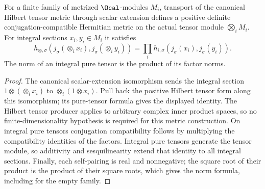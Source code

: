 \begin{lemma}
\label{lem:arithmetic-tensor-metric}
\leanok
For a finite family of metrized $\Ocal$-modules $M_i$, transport of the
canonical Hilbert tensor metric through scalar extension defines a positive
definite conjugation-compatible Hermitian metric on the actual tensor module
$\bigotimes_i M_i$. For integral sections $x_i,y_i\in M_i$ it satisfies
\[
 h_{\otimes,\sigma}(j_\sigma(\otimes_i x_i),j_\sigma(\otimes_i y_i))
   =\prod_i h_{i,\sigma}(j_\sigma(x_i),j_\sigma(y_i)).
\]
The norm of an integral pure tensor is the product of its factor norms.
\end{lemma}
\begin{proof}
The canonical scalar-extension isomorphism sends the integral section
$1\otimes(\otimes_i x_i)$ to $\otimes_i(1\otimes x_i)$.
Pull back the positive Hilbert tensor form along this isomorphism;
its pure-tensor formula gives the displayed identity. The Hilbert tensor
producer applies to arbitrary complex inner product spaces, so no
finite-dimensionality hypothesis is required for this metric construction.
On integral pure tensors conjugation compatibility follows by multiplying
the compatibility identities of the factors. Integral pure tensors generate
the tensor module, so additivity and sesquilinearity extend that identity
to all integral sections. Finally, each self-pairing is real and nonnegative;
the square root of their product is the product of their square roots,
which gives the norm formula, including for the empty family.
\end{proof}

